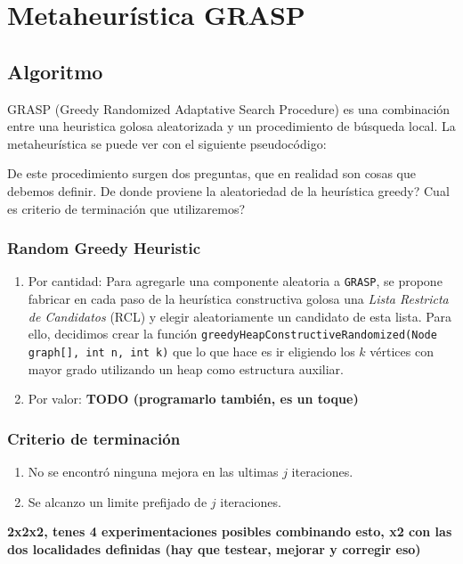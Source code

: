 \section{Metaheurística GRASP}

\subsection{Algoritmo}

GRASP (Greedy Randomized Adaptative Search Procedure) es una combinación entre una heuristica golosa aleatorizada y un procedimiento de búsqueda local. La metaheurística se puede ver con el siguiente pseudocódigo:

\begin{algorithmic}
\EndWhile
\EndProcedure
\end{algorithmic}

De este procedimiento surgen dos preguntas, que en realidad son cosas que debemos definir. De donde proviene la aleatoriedad de la heurística greedy? Cual es criterio de terminación que utilizaremos?

\subsubsection{Random Greedy Heuristic}

\begin{enumerate}
\item Por cantidad:
Para agregarle una componente aleatoria a \texttt{GRASP}, se propone fabricar en cada paso de la heurística constructiva golosa una \textit{Lista Restricta de Candidatos} (RCL) y elegir aleatoriamente un candidato de esta lista. Para ello, decidimos crear la función \texttt{greedyHeapConstructiveRandomized(Node graph[], int n, int k)} que lo que hace es ir eligiendo los $k$ vértices con mayor grado utilizando un heap como estructura auxiliar.
\item Por valor: \textbf{TODO (programarlo también, es un toque)}
\end{enumerate}

\subsubsection{Criterio de terminación}
\begin{enumerate}
\item No se encontró ninguna mejora en las ultimas $j$ iteraciones.
\item Se alcanzo un limite prefijado de  $j$ iteraciones.
\end{enumerate}

\textbf{2x2x2, tenes 4 experimentaciones posibles combinando esto, x2 con las dos localidades definidas (hay que testear, mejorar y corregir eso)}
